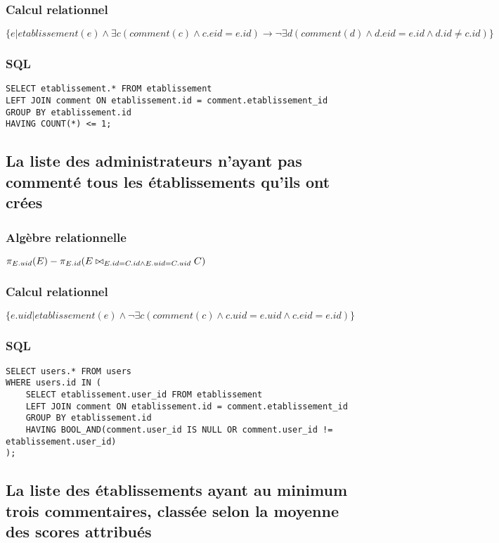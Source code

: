 \subsubsection{Calcul relationnel}

\(
\{e | etablissement(e) \land \exists c(comment(c) \land c.eid = e.id) \rightarrow \neg\exists d(comment(d) \land d.eid = e.id \land d.id \neq c.id)\}
\)
\subsubsection{SQL}
\begin{lstlisting}
SELECT etablissement.* FROM etablissement
LEFT JOIN comment ON etablissement.id = comment.etablissement_id
GROUP BY etablissement.id
HAVING COUNT(*) <= 1;
\end{lstlisting}

\subsection{La liste des administrateurs n’ayant pas commenté tous les établissements qu’ils ont crées}
\subsubsection{Algèbre relationnelle}
\(
\pi_{E.uid}(E) - \pi_{E.id}(E\bowtie_{E.id = C.id \land E.uid = C.uid}C)
\)
\subsubsection{Calcul relationnel}
\(
\{e.uid|etablissement(e)\land \neg \exists c(comment(c) \land c.uid = e.uid \land c.eid = e.id)\}
\)
\subsubsection{SQL}
\begin{lstlisting}
SELECT users.* FROM users 
WHERE users.id IN (
    SELECT etablissement.user_id FROM etablissement 
    LEFT JOIN comment ON etablissement.id = comment.etablissement_id 
    GROUP BY etablissement.id 
    HAVING BOOL_AND(comment.user_id IS NULL OR comment.user_id != etablissement.user_id)
);
\end{lstlisting}

\subsection{La liste des établissements ayant au minimum trois commentaires, classée selon la moyenne des scores attribués}
